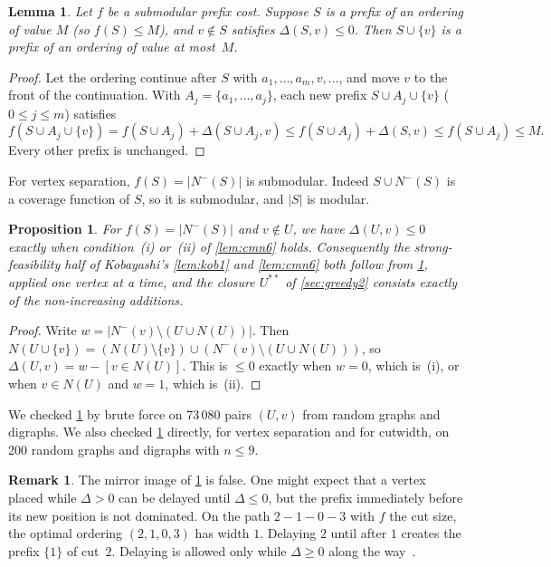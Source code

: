 \documentclass[11pt]{article}
\newtheorem{lemma}[theorem]{Lemma}
\newtheorem{proposition}[theorem]{Proposition}
\theoremstyle{definition}
\newtheorem{remark}[theorem]{Remark}
\newcommand{\Nm}{N^{-}}
\newcommand{\set}[1]{\{#1\}}
\begin{document}
\begin{lemma}\label{lem:submod}
Let $f$ be a submodular prefix cost. Suppose $S$ is a prefix of an ordering
of value $M$ (so $f(S)\le M$), and $v\notin S$ satisfies $\Delta(S,v)\le0$.
Then $S\cup\set v$ is a prefix of an ordering of value at most~$M$.
\end{lemma}
\begin{proof}
Let the ordering continue after $S$ with $a_1,\dots,a_m,v,\dots$, and move
$v$ to the front of the continuation. With $A_j=\set{a_1,\dots,a_j}$, each
new prefix $S\cup A_j\cup\set v$ ($0\le j\le m$) satisfies
\[
f(S\cup A_j\cup\set v)=f(S\cup A_j)+\Delta(S\cup A_j,v)\le
f(S\cup A_j)+\Delta(S,v)\le f(S\cup A_j)\le M.
\]
Every other prefix is unchanged.
\end{proof}

For vertex separation, $f(S)=|\Nm(S)|$ is submodular. Indeed
$S\cup\Nm(S)$ is a coverage function of $S$, so it is submodular, and $|S|$
is modular.

\begin{proposition}\label{prop:vsrules}
For $f(S)=|\Nm(S)|$ and $v\notin U$, we have $\Delta(U,v)\le0$ exactly when
condition~\textup{(i)} or~\textup{(ii)} of \cref{lem:cmn6} holds.
Consequently the strong-feasibility half of Kobayashi's \cref{lem:kob1}
and \cref{lem:cmn6} both follow from \cref{lem:submod}, applied one vertex at a time, and the closure $U^{**}$
of \cref{sec:greedy2} consists exactly of the non-increasing additions.
\end{proposition}
\begin{proof}
Write $w=|\Nm(v)\setminus(U\cup N(U))|$. Then $N(U\cup\set v)=(N(U)\setminus\set
v)\cup(\Nm(v)\setminus(U\cup N(U)))$, so $\Delta(U,v)=w-[v\in N(U)]$. This
is $\le0$ exactly when $w=0$, which is~(i), or when $v\in N(U)$ and $w=1$,
which is~(ii).
\end{proof}

We checked \cref{prop:vsrules} by brute force on 73\,080 pairs $(U,v)$ from
random graphs and digraphs. We also checked \cref{lem:submod} directly, for
vertex separation and for cutwidth, on 200 random graphs and digraphs with
$n\le9$.

\begin{remark}
The mirror image of \cref{lem:submod} is false. One might expect that a
vertex placed while $\Delta>0$ can be delayed until $\Delta\le0$, but the
prefix immediately before its new position is not dominated. On the path
$2-1-0-3$ with $f$ the cut size, the optimal ordering $(2,1,0,3)$ has width
$1$. Delaying $2$ until after $1$ creates the prefix $\set1$ of cut~$2$.
Delaying is allowed only while $\Delta\ge0$ along the way~\cite{CLPPS14}.
\end{remark}
\end{document}
